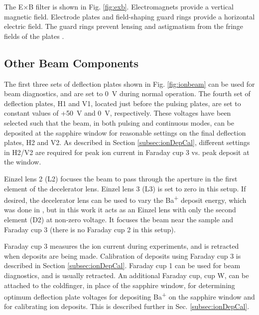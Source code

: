 The E$\times$B filter is shown in Fig. \ref{fig:exb}.  Electromagnets provide a vertical magnetic field.  Electrode plates and field-shaping guard rings provide a horizontal electric field.  The guard rings prevent lensing and astigmatism from the fringe fields of the plates \cite{Colutron}.


\subsection{Other Beam Components}

The first three sets of deflection plates shown in Fig. \ref{fig:ionbeam} can be used for beam diagnostics, and are set to 0~V during normal operation.  The fourth set of deflection plates, H1 and V1, located just before the pulsing plates, are set to constant values of +50~V and 0~V, respectively.  These voltages have been selected such that the beam, in both pulsing and continuous modes, can be deposited at the sapphire window for reasonable settings on the final deflection plates, H2 and V2.  As described in Section \ref{subsec:ionDepCal}, different settings in H2/V2 are required for peak ion current in Faraday cup 3 vs. peak deposit at the window.

Einzel lens 2 (L2) focuses the beam to pass through the aperture in the first element of the decelerator lens.  Einzel lens 3 (L3) is set to zero in this setup.  If desired, the decelerator lens can be used to vary the Ba\textsuperscript{+} deposit energy, which was done in \cite{Shon}, but in this work it acts as an Einzel lens with only the second element (D2) at non-zero voltage.  It focuses the beam near the sample and Faraday cup 3 (there is no Faraday cup 2 in this setup).

Faraday cup 3 measures the ion current during experiments, and is retracted when deposits are being made.  Calibration of deposits using Faraday cup 3 is described in Section \ref{subsec:ionDepCal}.  Faraday cup 1 can be used for beam diagnostics, and is usually retracted.  An additional Faraday cup, cup W, can be attached to the coldfinger, in place of the sapphire window, for determining optimum deflection plate voltages for depositing Ba\textsuperscript{+} on the sapphire window and for calibrating ion deposits.  This is described further in Sec. \ref{subsec:ionDepCal}.

